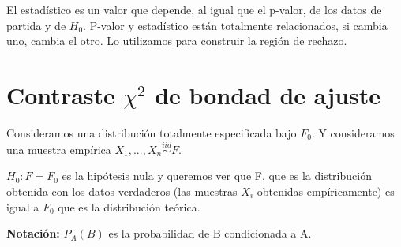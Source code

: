 \documentclass[nochap]{apuntes}
\begin{document}
\begin{defn}[T = valor Estadístico]
El estadístico es un valor que depende, al igual que el p-valor, de los datos de partida y de $H_0$. P-valor y estadístico están totalmente relacionados, si cambia uno, cambia el otro. Lo utilizamos para construir la región de rechazo.
\end{defn}

\section{Contraste $\chi^2$ de bondad de ajuste}
Consideramos una distribución totalmente especificada bajo $F_0$. Y consideramos una muestra empírica $X_1,...,X_n \stackrel{iid}{\sim} F$.

$H_0: F=F_0$ es la hipótesis nula y queremos ver que F, que es la distribución obtenida con los datos verdaderos (las muestras $X_i$ obtenidas empíricamente) es igual a $F_0$ que es la distribución teórica.

\textbf{Notación: }$P_A(B)$ es la probabilidad de B condicionada a A.
\end{document}
